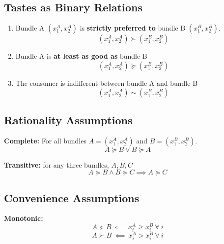 \documentclass[]{article}
\begin{document}
        \subsection{Tastes as Binary Relations}
            \begin{definition}
                \begin{enumerate}
                    \item Bundle A $(x_1^A, x_2^A)$ is \textbf{strictly preferred to} bundle B $(x_1^B, x_2^B)$.
                        \[
                            (x_1^A, x_2^A) \succ (x_1^B, x_2^B)
                        \]
                    \item Bundle A is \textbf{at least as good as} bundle B
                        \[
                            (x_1^A, x_2^A) \succcurlyeq (x_1^B, x_2^B)
                        \]
                    \item The consumer is indifferent between bundle A and bundle B
                        \[
                            (x_1^A, x_2^A) \sim (x_1^B, x_2^B)
                        \]
                \end{enumerate}
            \end{definition}
        
        \subsection{Rationality Assumptions}
            \begin{definition}
                \textbf{Complete: } For all bundles $A=(x_1^A, x_2^A)$ and $B=(x_1^B, x_2^B)$.
                \[
                    A \succcurlyeq B \lor B \succcurlyeq A
                \]
            \end{definition}
            
            \begin{definition}
                \textbf{Transitive: } for any three bundles, $A, B, C$
                \[
                    A \succcurlyeq B \land B \succcurlyeq C \implies A \succcurlyeq C
                \]
            \end{definition}
        
        \subsection{Convenience Assumptions}
            \begin{definition}
                \textbf{Monotonic: }
                \[
                    A \succcurlyeq B\ \impliedby \ x_i^A \geq x_i^B \ \forall \ i
                \]
                \[
                    A \succ B\ \impliedby \ x_i^A > x_i^B \ \forall \ i
                \]
            \end{definition}
            
\end{document}
